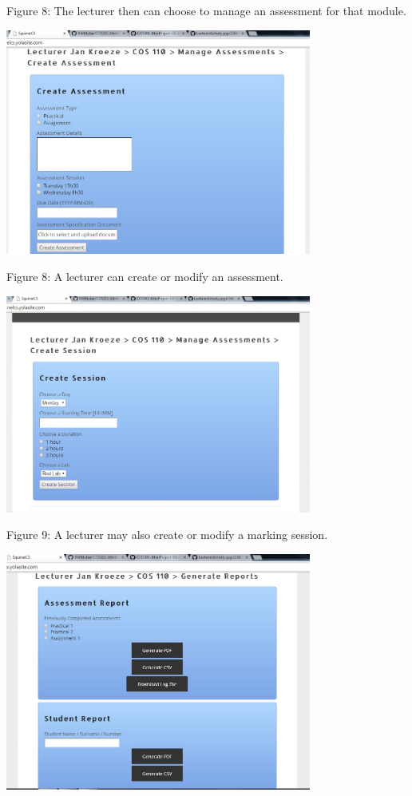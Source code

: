 \documentclass[a4paper]{article}
\begin{document}
\begin{center}
Figure 8: The lecturer then can choose to manage an assessment for that module.
\end{center}
\includegraphics[width=380px]{Images/WEBUILecturer_CreateAssessment.jpg}
\begin{center}
Figure 8: A lecturer can create or modify an assessment.
\end{center}
\includegraphics[width=380px]{Images/WEBUILecturer_CreateSession.jpg}
\begin{center}
Figure 9: A lecturer may also create or modify a marking session.
\end{center}
\includegraphics[width=380px]{Images/WEBUILecturer_GenerateReprots.jpg}
\end{document}
